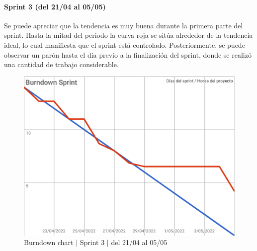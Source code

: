 \paragraph{Sprint 3 (del 21/04 al 05/05)}
Se puede apreciar que la tendencia es muy buena durante la primera parte del sprint. Hasta la mitad del periodo la curva roja se sitúa alrededor de la tendencia ideal, lo cual manifiesta que el sprint está controlado. Posteriormente, se puede observar un parón hasta el día previo a la finalización del sprint, donde se realizó una cantidad de trabajo considerable.
\begin{figure}[H]
    \centering
    \includegraphics[width=1\linewidth]{text/image/BurndownChart3.pdf}
    \caption{Burndown chart $|$ Sprint 3 $|$ del 21/04 al 05/05}
    \label{fig:burndown_chart_3}
\end{figure}

\newpage
